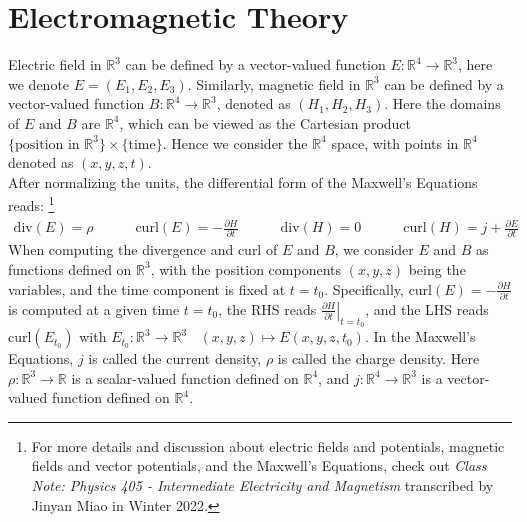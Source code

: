 \documentclass[15pt]{book}
\theoremstyle{break}
\theoremstyle{break}
\newcommand{\R}{\mathbb{R}}
\begin{document}
\newpage
\section[Electromagnetic Theory]{\color{red}Electromagnetic Theory\color{black}}
Electric field in $\R^3$ can be defined by a vector-valued function $E:\R^4 \to \R^3$, here we denote $E = (E_1, E_2, E_3)$. Similarly, magnetic field in $\R^3$ can be defined by a vector-valued function $B :\R^4 \to \R^3$, denoted as $(H_1, H_2, H_3)$. Here the domains of $E$ and $B$ are $\R^4$, which can be viewed as the Cartesian product $\{\text{position in }\R^3\}\times \{\text{time}\}$. Hence we consider the $\R^4$ space, with points in $\R^4$ denoted as $(x,y,z,t)$.\\

After normalizing the units, the differential form of the Maxwell's Equations reads: \footnote{For more details and discussion about electric fields and potentials, magnetic fields and vector potentials, and the Maxwell's Equations, check out \textit{Class Note: Physics 405 - Intermediate Electricity and Magnetism} transcribed by Jinyan Miao in Winter 2022.}
\begin{align*}
\text{div}(E)= \rho \qquad\quad \text{curl}(E) = -\frac{\partial H}{\partial t} \qquad\quad \text{div}(H) = 0 \qquad\quad \text{curl}(H) = j + \frac{\partial E}{\partial t} \tag{MQ}
\end{align*}
When computing the divergence and curl of $E$ and $B$, we consider $E$ and $B$ as functions defined on $\R^3$, with the position components $(x,y,z)$ being the variables, and the time component is fixed at $t= t_0$. Specifically, $ \text{curl}(E) = -\frac{\partial H}{\partial t} $ is computed at a given time $t = t_0$, the RHS reads $\left.\frac{\partial H}{\partial t}\right|_{t = t_0}$, and the LHS reads $\text{curl}(E_{t_0})$ with $E_{t_0}:\R^3 \to \R^3 \ \ \ \ (x,y,z)\mapsto E(x,y,z,t_0)$. In the Maxwell's Equations, $j$ is called the current density, $\rho$ is called the charge density. Here $\rho:\R^3 \to \R$ is a scalar-valued function defined on $\R^4$, and $j:\R^4 \to \R^3$ is a vector-valued function defined on $\R^4$. \\
\end{document}
